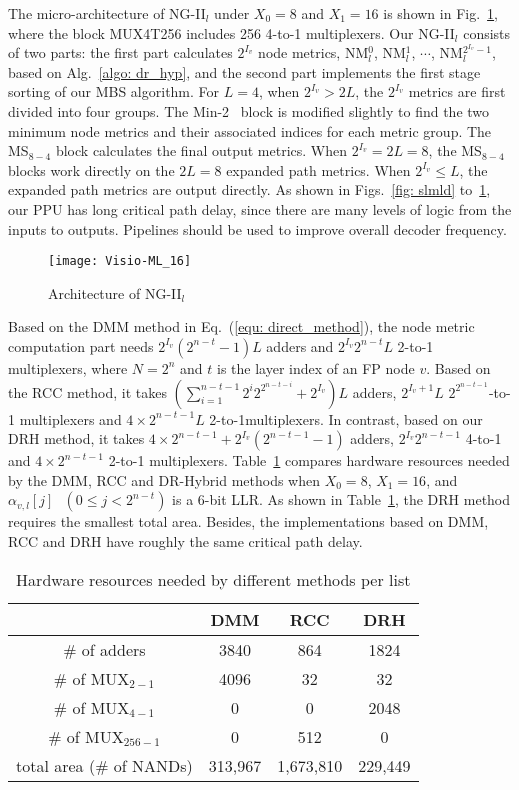 \documentclass[journal]{IEEEtran}
\begin{document}
The micro-architecture of NG-II$_l$ under $X_0=8$ and $X_1=16$ is shown in Fig.~\ref{fig:ML16}, where the block MUX4T256 includes 256 4-to-1 multiplexers. Our NG-II$_l$ consists of two parts: the first part calculates $2^{I_v}$ node metrics, NM$_l^0$, NM$_l^1$, $\cdots$, NM$_l^{2^{I_v}-1}$, based on Alg.~\ref{algo: dr_hyp}, and the second part implements the first stage sorting of our MBS algorithm. For $L=4$, when $2^{I_v} > 2L$, the $2^{I_v}$ metrics are first divided into four groups. The Min-2~\cite{min2} block is modified slightly to find the two minimum node metrics and their associated indices for each metric group. The MS$_{8-4}$ block calculates the final output metrics. When $2^{I_v} = 2L = 8$, the MS$_{8-4}$ blocks work directly on the $2L = 8$ expanded path metrics. When $2^{I_v} \leqslant L$, the expanded path metrics are output directly. As shown in Figs.~\ref{fig: slmld} to~\ref{fig:ML16}, our PPU has long critical path delay, since there are many levels of logic from the inputs to outputs. Pipelines should be used to improve overall decoder frequency.

\begin{figure}[htbp]
\centering
\texttt{[image: Visio-ML\_16]}
\caption{Architecture of NG-II$_l$}\label{fig:ML16}
\end{figure}

Based on the DMM method in Eq.~(\ref{equ: direct_method}), the node metric computation part needs $2^{I_v}(2^{n-t}-1)L$ adders and $2^{I_v}2^{n-t}L$ 2-to-1 multiplexers, where $N=2^n$ and $t$ is the layer index of an FP node $v$. Based on the RCC method, it takes $(\sum_{i=1}^{n-t-1}2^i2^{2^{n-t-i}}+2^{I_v})L$ adders, $2^{I_v+1}L$ $2^{2^{n-t-1}}$-to-1 multiplexers and $4\times 2^{n-t-1}L$ 2-to-1multiplexers.
In contrast, based on our DRH method, it takes $4\times 2^{n-t-1}+2^{I_v}(2^{n-t-1}-1)$ adders, $2^{I_v}2^{n-t-1}$ 4-to-1 and $4\times 2^{n-t-1}$ 2-to-1 multiplexers. Table~\ref{tab:ML_16} compares hardware resources needed by the DMM, RCC and DR-Hybrid methods when $X_0=8$, $X_1=16$, and $\alpha_{v,l}[j]\text{ }(0 \leq j < 2^{n-t})$ is a 6-bit LLR. As shown in Table~\ref{tab:ML_16}, the DRH method requires the smallest total area. Besides, the implementations based on DMM, RCC and DRH have roughly the same critical path delay.

\begin{table}[htbp]
\begin{center}
\caption{Hardware resources needed by different methods per list}
\label{tab:ML_16}
\begin{tabular}{|c|c|c|c|}
\hline
& DMM & RCC & DRH \\ \hline
\# of adders & 3840 & 864 & 1824 \\ \hline
\# of MUX$_{2-1}$ & 4096 & 32 & 32 \\ \hline
\# of MUX$_{4-1}$ & 0 & 0 & 2048 \\ \hline
\# of MUX$_{256-1}$ & 0 & 512 & 0 \\ \hline
total area (\# of NANDs) & 313,967 & 1,673,810 & 229,449 \\ \hline
\end{tabular}
\end{center}
\end{table}
\end{document}
